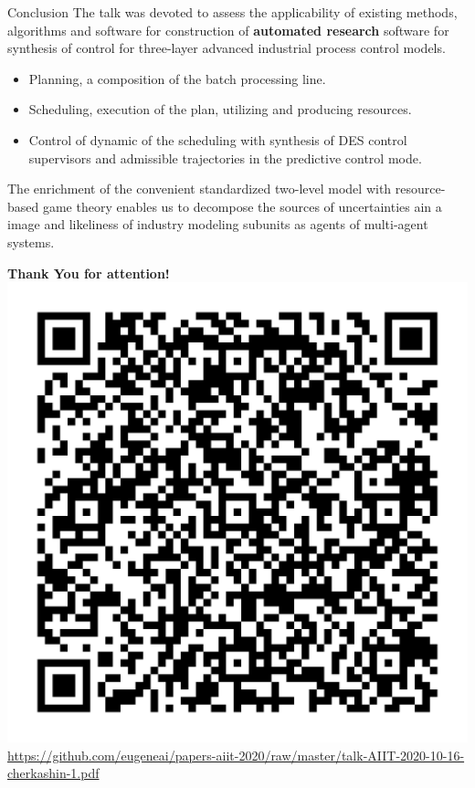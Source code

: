 \documentclass[10pt,dvipsnames]{beamer}
\begin{document}
\begin{frame}{Conclusion}
  The talk was devoted to assess the applicability of existing methods, algorithms and software for construction of \textbf{automated research} software for synthesis of control for three-layer advanced industrial process control models.
  \begin{itemize}
  \item Planning, a composition of the batch processing line.
  \item Scheduling, execution of the plan, utilizing and producing resources.
  \item Control of dynamic of the scheduling with synthesis of DES control supervisors and admissible trajectories in the predictive control mode.
  \end{itemize}

  The enrichment of the convenient standardized two-level model with resource-based game theory enables us to decompose the sources of uncertainties ain a image and likeliness of industry modeling subunits as agents of multi-agent systems.

\end{frame}


\begin{frame}{}
  \vfill
  \centering
  \Huge \textbf{Thank You for attention!}
  \vfill
  \includegraphics[width=0.5\linewidth]{qr-ind.png}\\
  \normalsize\url{https://github.com/eugeneai/papers-aiit-2020/raw/master/talk-AIIT-2020-10-16-cherkashin-1.pdf}
\end{frame}
\end{document}
